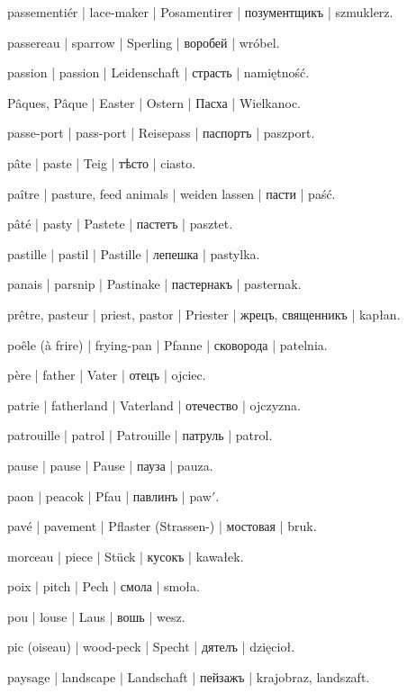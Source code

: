 \begin{outdent}{1em}
\uvsubentry{}
passementiér | lace-maker | Posamentirer | позументщикъ | szmuklerz.

passereau | sparrow | Sperling | воробей | wróbel.

passion | passion | Leidenschaft | страсть | namiętność.

Pâques, Pâque | Easter | Ostern | Пасха | Wielkanoc.

passe-port | pass-port | Reisepass | паспортъ | paszport.

pâte | paste | Teig | тѣсто | ciasto.

paître | pasture, feed animals | weiden lassen | пасти | paść.

pâté | pasty | Pastete | пастетъ | pasztet.

pastille | pastil | Pastille | лепешка | pastylka.

panais | parsnip | Pastinake | пастернакъ | pasternak.

prêtre, pasteur | priest, pastor | Priester | жрецъ,
священникъ | kapłan.

poêle (à frire) | frying-pan | Pfanne | сковорода | patelnia.

père | father | Vater | отецъ | ojciec.

\uvsubentry{}
patrie | fatherland | Vaterland | отечество | ojczyzna.

patrouille | patrol | Patrouille | патруль | patrol.

pause | pause | Pause | пауза | pauza.

paon | peacok | Pfau | павлинъ | paw$'$.

pavé | pavement | Pflaster (Strassen-) | мостовая | bruk.

morceau | piece | Stück | кусокъ | kawałek.

poix | pitch | Pech | смола | smoła.

pou | louse | Laus | вошь | wesz.

pic (oiseau) | wood-peck | Specht | дятелъ | dzięcioł.

paysage | landscape | Landschaft | пейзажъ | krajobraz, landszaft.


\end{outdent}
